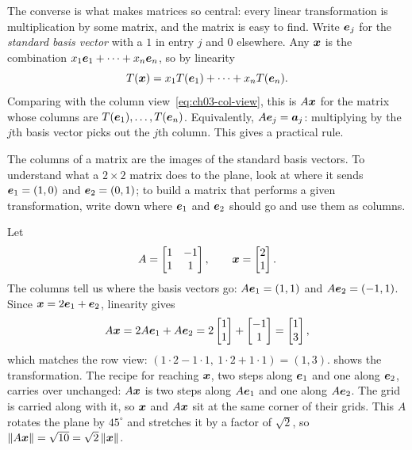 The converse is what makes matrices so central: every linear
transformation is multiplication by some matrix, and the matrix is easy to
find. Write $\bm{e}_j$ for the \emph{standard basis vector} with a $1$
in entry $j$ and $0$ elsewhere. Any $\bm{x}$ is the combination
$x_1 \bm{e}_1 + \dots + x_n \bm{e}_n$, so by linearity
\[
  T(\bm{x}) = x_1 T(\bm{e}_1) + \dots + x_n T(\bm{e}_n) .
\]
Comparing with the column view~\eqref{eq:ch03-col-view}, this is
$A\bm{x}$ for the matrix whose columns are $T(\bm{e}_1), \dots,
T(\bm{e}_n)$. Equivalently, $A\bm{e}_j = \bm{a}_j$: multiplying by
the $j$th basis vector picks out the $j$th column. This gives a practical
rule.

\begin{tip}
  The columns of a matrix are the images of the standard basis vectors.
  To understand what a $2 \times 2$ matrix does to the plane, look at
  where it sends $\bm{e}_1 = (1, 0)$ and $\bm{e}_2 = (0, 1)$; to build
  a matrix that performs a given transformation, write down where
  $\bm{e}_1$ and $\bm{e}_2$ should go and use them as columns.
\end{tip}

\begin{example}
  \label{ex:ch03-transform-vector}
  Let
  \[
    A = \begin{bmatrix} 1 & -1 \\ 1 & 1 \end{bmatrix},
    \qquad
    \bm{x} = \begin{bmatrix} 2 \\ 1 \end{bmatrix}.
  \]
  The columns tell us where the basis vectors go:
  $A\bm{e}_1 = (1, 1)$ and $A\bm{e}_2 = (-1, 1)$. Since
  $\bm{x} = 2\bm{e}_1 + \bm{e}_2$, linearity gives
  \[
    A\bm{x} = 2 A\bm{e}_1 + A\bm{e}_2
    = 2 \begin{bmatrix} 1 \\ 1 \end{bmatrix}
      + \begin{bmatrix} -1 \\ 1 \end{bmatrix}
    = \begin{bmatrix} 1 \\ 3 \end{bmatrix},
  \]
  which matches the row view: $(1 \cdot 2 - 1 \cdot 1,\ 1 \cdot 2 + 1
  \cdot 1) = (1, 3)$.  shows the
  transformation. The recipe for reaching $\bm{x}$, two steps along
  $\bm{e}_1$ and one along $\bm{e}_2$, carries over unchanged: $A\bm{x}$
  is two steps along $A\bm{e}_1$ and one along $A\bm{e}_2$. The grid
  is carried along with it, so $\bm{x}$ and $A\bm{x}$ sit at the same
  corner of their grids. This $A$ rotates the plane by $45^\circ$ and
  stretches it by a factor of $\sqrt{2}$, so $\|A\bm{x}\| =
  \sqrt{10} = \sqrt{2}\,\|\bm{x}\|$.
\end{example}

